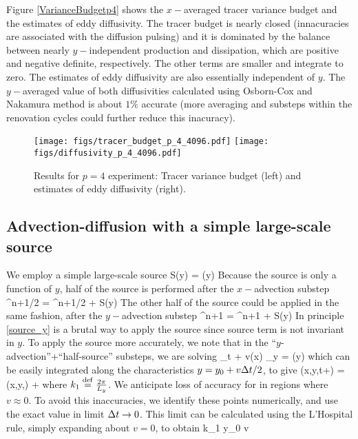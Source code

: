 \documentclass[11pt]{article}
\begin{document}
Figure \eqref{VarianceBudgetp4} shows the $x-$averaged tracer variance budget and the estimates of eddy diffusivity.
The tracer budget is nearly closed (innacuracies are associated with the diffusion pulsing) and it is dominated by the 
balance between nearly $y-$independent production and dissipation, which are positive and negative definite, respectively. The other terms are smaller and integrate to zero. The estimates of eddy diffusivity are also essentially independent of $y$. The $y-$averaged value of both diffusivities calculated using Osborn-Cox and Nakamura method is about $1\%$ accurate (more averaging and substeps within the renovation cycles could further reduce this inacuracy).

\begin{figure}[ht]
    \centering
       \texttt{[image: figs/tracer\_budget\_p\_4\_4096.pdf]}
       \texttt{[image: figs/diffusivity\_p\_4\_4096.pdf]}
       \caption{\small Results for $p=4$ experiment: Tracer variance budget (left) and estimates of eddy diffusivity (right).}
		    \label{VarianceBudgetp4}
\end{figure}

\clearpage
\subsection{Advection-diffusion with a simple large-scale source}

We employ a simple large-scale source
\beq
S(y) = \cos \left(y\right)\per
\eeq
Because the source is only a function of $y$, half of the source is performed after the $x-$advection
substep
\beq
\label{source_x}
\vth^{n+1/2} = \vth^{n+1/2} +  S(y)\per
\eeq
The other half of the source could be applied in the same fashion, after the $y-$advection
substep
\beq
\label{source_y}
\vth^{n+1} = \vth^{n+1} +  S(y)\per
\eeq
In principle \eqref{source_y} is a brutal way to apply the source since source term is not invariant in $y$.
To apply the source more accurately, we note that in the ``$y$-advection''+``half-source'' substeps, we are
solving
\beq
\vth_t + v(x) \vth_y = \cos \left(y\right)\com
\eeq
which can be easily integrated along the characteristics $y = y_0 + v \Delta t/2$, to give
\beq
\label{adv_source_y}
\vth(x,y,t+\dt) = \vth(x,y,\dt) + \per
\eeq
where $k_1 \stackrel{\mathrm{def}}{=} \frac{2\pi}{L_y}$. We anticipate loss of accuracy for in regions where $v\approx 0$. To
avoid this inaccuracies, we identify these points numerically, and use the exact value in limit $\Delta t \to 0$.
This limit can be calculated using the L'Hospital rule, simply expanding about $v=0$, to obtain
\beq
{} \to {}\cos k_1 y_0 \qquad {}
\qquad v \per
\eeq
\end{document}
